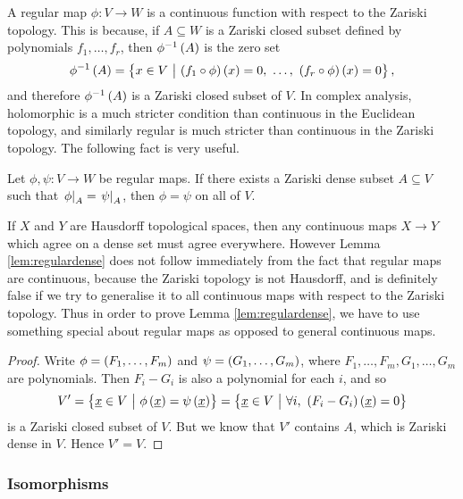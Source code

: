 A regular map $ \phi : V \to W $ is a continuous function with respect to the Zariski topology. This is because, if $ A \subseteq W $ is a Zariski closed subset defined by polynomials $ f_1, \dots, f_r $, then $ \phi^{-1}\br{A} $ is the zero set
$$ \phi^{-1}\br{A} = \cbr{x \in V \st \br{f_1 \circ \phi}\br{x} = 0, \ \dots, \ \br{f_r \circ \phi}\br{x} = 0}, $$
and therefore $ \phi^{-1}\br{A} $ is a Zariski closed subset of $ V $. In complex analysis, holomorphic is a much stricter condition than continuous in the Euclidean topology, and similarly regular is much stricter than continuous in the Zariski topology. The following fact is very useful.

\begin{lemma}
\label{lem:regulardense}
Let $ \phi, \psi : V \to W $ be regular maps. If there exists a Zariski dense subset $ A \subseteq V $ such that $ \left. \phi \right|_A = \left. \psi \right|_A $, then $ \phi = \psi $ on all of $ V $.
\end{lemma}

\begin{note*}
If $ X $ and $ Y $ are Hausdorff topological spaces, then any continuous maps $ X \to Y $ which agree on a dense set must agree everywhere. However Lemma \ref{lem:regulardense} does not follow immediately from the fact that regular maps are continuous, because the Zariski topology is not Hausdorff, and is definitely false if we try to generalise it to all continuous maps with respect to the Zariski topology. Thus in order to prove Lemma \ref{lem:regulardense}, we have to use something special about regular maps as opposed to general continuous maps.
\end{note*}

\begin{proof}
Write $ \phi = \br{F_1, \dots, F_m} $ and $ \psi = \br{G_1, \dots, G_m} $, where $ F_1, \dots, F_m, G_1, \dots, G_m $ are polynomials. Then $ F_i - G_i $ is also a polynomial for each $ i $, and so
$$ V' = \cbr{\underline{x} \in V \st \phi\br{\underline{x}} = \psi\br{\underline{x}}} = \cbr{\underline{x} \in V \st \forall i, \ \br{F_i - G_i}\br{\underline{x}} = 0} $$
is a Zariski closed subset of $ V $. But we know that $ V' $ contains $ A $, which is Zariski dense in $ V $. Hence $ V' = V $.
\end{proof}

\subsubsection{Isomorphisms}

